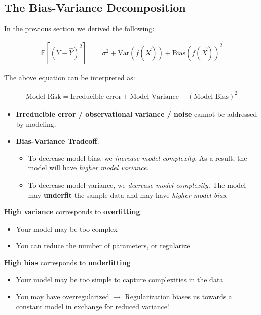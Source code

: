 \documentclass[
  letterpaper,
  DIV=11,
  numbers=noendperiod]{scrreprt}
\providecommand{\tightlist}{%
  \setlength{\itemsep}{0pt}\setlength{\parskip}{0pt}}\usepackage{longtable,booktabs,array}
\begin{document}
\subsection{The Bias-Variance
Decomposition}\label{the-bias-variance-decomposition}

In the previous section we derived the following:

\begin{align*}
\mathbb{E}[(Y - \hat{Y})^2] &= \sigma ^ 2 + \text{Var}(f(\vec{X})) + \text{Bias}(f(\vec{X}))^2
\end{align*}

The above equation can be interpreted as:

\begin{align*}
\text{Model Risk} = \text{Irreducible error} + \text{Model Variance} + (\text{Model Bias})^2
\end{align*}

\begin{itemize}
\tightlist
\item
  \textbf{Irreducible error / observational variance / noise} cannot be
  addressed by modeling.
\item
  \textbf{Bias-Variance Tradeoff}:

  \begin{itemize}
  \tightlist
  \item
    To decrease model bias, we \emph{increase model complexity}. As a
    result, the model will have \emph{higher model variance}.
  \item
    To decrease model variance, we \emph{decrease model complexity}. The
    model may \textbf{underfit} the sample data and may have
    \emph{higher model bias}.
  \end{itemize}
\end{itemize}

\textbf{High variance} corresponds to \textbf{overfitting}.

\begin{itemize}
\tightlist
\item
  Your model may be too complex
\item
  You can reduce the number of parameters, or regularize
\end{itemize}

\textbf{High bias} corresponds to \textbf{underfitting}

\begin{itemize}
\tightlist
\item
  Your model may be too simple to capture complexities in the data
\item
  You may have overregularized \(\rightarrow\) Regularization biases us
  towards a constant model in exchange for reduced variance!
\end{itemize}
\end{document}
